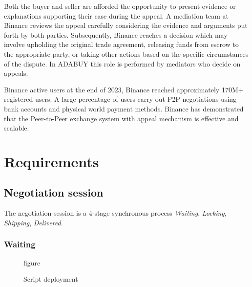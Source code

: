 \documentclass[12pt]{article}
\begin{document}
Both the buyer and seller are afforded the opportunity to present evidence or explanations supporting their case during the appeal. A mediation team at Binance reviews the appeal carefully considering the evidence and arguments put forth by both parties. Subsequently, Binance reaches a decision which may involve upholding the original trade agreement, releasing funds from escrow to the appropriate party, or taking other actions based on the specific circumstances of the dispute. In ADABUY this role is performed by mediators who decide on appeals.

Binance active users at the end of 2023, Binance reached approximately 170M+ registered users. A large percentage of users carry out P2P negotiations using bank accounts and physical world payment methods. Binance has demonstrated that the Peer-to-Peer exchange system with appeal mechanism is effective and scalable.


\section{ Requirements }

\subsection { Negotiation session }

The negotiation session is a 4-stage synchronous process \emph{Waiting}, \emph{Locking}, \emph{Shipping}, \emph{Delivered}.

\subsubsection { Waiting }

\begin{figure}[ht]
  \centering
figure
  \caption{Script deployment}
  \label{fig:mi_imagen}
\end{figure}
\end{document}
